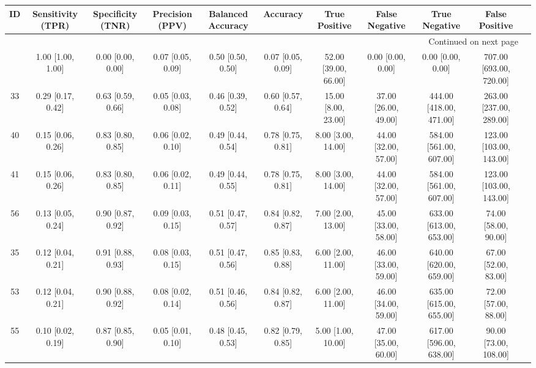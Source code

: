 \documentclass[8pt]{article}
\begin{document}
\begin{center}
\begin{footnotesize}
\begin{longtable}{|ccccccccccc|}
\toprule
 ID &  Sensitivity (TPR) &  Specificity (TNR) &    Precision (PPV) &  Balanced Accuracy &           Accuracy &         True Positive &        False Negative &            True Negative &           False Positive \\
\midrule
\endhead
\midrule
\multicolumn{10}{r}{{Continued on next page}} \\
\midrule
\endfoot

\bottomrule
\endlastfoot
 42 &  1.00 [1.00, 1.00] &  0.00 [0.00, 0.00] &  0.07 [0.05, 0.09] &  0.50 [0.50, 0.50] &  0.07 [0.05, 0.09] &  52.00 [39.00, 66.00] &     0.00 [0.00, 0.00] &        0.00 [0.00, 0.00] &  707.00 [693.00, 720.00] \\
 33 &  0.29 [0.17, 0.42] &  0.63 [0.59, 0.66] &  0.05 [0.03, 0.08] &  0.46 [0.39, 0.52] &  0.60 [0.57, 0.64] &   15.00 [8.00, 23.00] &  37.00 [26.00, 49.00] &  444.00 [418.00, 471.00] &  263.00 [237.00, 289.00] \\
 40 &  0.15 [0.06, 0.26] &  0.83 [0.80, 0.85] &  0.06 [0.02, 0.10] &  0.49 [0.44, 0.54] &  0.78 [0.75, 0.81] &    8.00 [3.00, 14.00] &  44.00 [32.00, 57.00] &  584.00 [561.00, 607.00] &  123.00 [103.00, 143.00] \\
 41 &  0.15 [0.06, 0.26] &  0.83 [0.80, 0.85] &  0.06 [0.02, 0.11] &  0.49 [0.44, 0.55] &  0.78 [0.75, 0.81] &    8.00 [3.00, 14.00] &  44.00 [32.00, 57.00] &  584.00 [561.00, 607.00] &  123.00 [103.00, 143.00] \\
 56 &  0.13 [0.05, 0.24] &  0.90 [0.87, 0.92] &  0.09 [0.03, 0.15] &  0.51 [0.47, 0.57] &  0.84 [0.82, 0.87] &    7.00 [2.00, 13.00] &  45.00 [33.00, 58.00] &  633.00 [613.00, 653.00] &     74.00 [58.00, 90.00] \\
 35 &  0.12 [0.04, 0.21] &  0.91 [0.88, 0.93] &  0.08 [0.03, 0.15] &  0.51 [0.47, 0.56] &  0.85 [0.83, 0.88] &    6.00 [2.00, 11.00] &  46.00 [33.00, 59.00] &  640.00 [620.00, 659.00] &     67.00 [52.00, 83.00] \\
 53 &  0.12 [0.04, 0.21] &  0.90 [0.88, 0.92] &  0.08 [0.02, 0.14] &  0.51 [0.46, 0.56] &  0.84 [0.82, 0.87] &    6.00 [2.00, 11.00] &  46.00 [34.00, 59.00] &  635.00 [615.00, 655.00] &     72.00 [57.00, 88.00] \\
 55 &  0.10 [0.02, 0.19] &  0.87 [0.85, 0.90] &  0.05 [0.01, 0.10] &  0.48 [0.45, 0.53] &  0.82 [0.79, 0.85] &    5.00 [1.00, 10.00] &  47.00 [35.00, 60.00] &  617.00 [596.00, 638.00] &    90.00 [73.00, 108.00] \\

\end{longtable}
\end{footnotesize}
\end{center}
\end{document}
